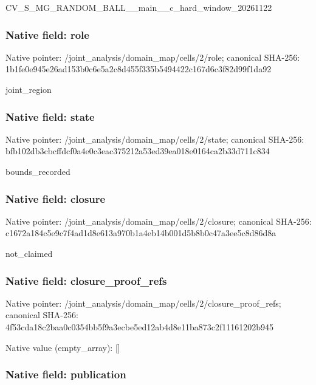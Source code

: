 \documentclass[10pt,a4paper]{article}
\begin{document}
CV\_S\_MG\_RANDOM\_BALL\_\_mai\allowbreak{}n\_\_c\_hard\_window\_2026112\allowbreak{}2


\subsubsection{Native field: role}


Native pointer: /joint\_analysis/domain\_map/cells/2/role; canonical SHA-256: 1b1fe0e945e26ad153b0c6e5\allowbreak{}a2c8d455f335b5494422c167\allowbreak{}d6c3f82d99f1da92


joint\_region


\subsubsection{Native field: state}


Native pointer: /joint\_analysis/domain\_m\allowbreak{}ap/cells/2/state; canonical SHA-256: bfb102db3cbcffdcf0a4e0c3\allowbreak{}eac375212a53ed39ea018e01\allowbreak{}64ca2b33d711c834


bounds\_recorded


\subsubsection{Native field: closure}


Native pointer: /joint\_analysis/domain\_m\allowbreak{}ap/cells/2/closure; canonical SHA-256: c1672a184c5e9c7f4ad1d8e6\allowbreak{}13a970b1a4eb14b001d5b8b0\allowbreak{}c47a3ee5c8d86d8a


not\_claimed


\subsubsection{Native field: closure\_proof\_refs}


Native pointer: /joint\_analysis/domain\_m\allowbreak{}ap/cells/2/closure\_proof\allowbreak{}\_refs; canonical SHA-256: 4f53cda18c2baa0c0354bb5f\allowbreak{}9a3ecbe5ed12ab4d8e11ba87\allowbreak{}3c2f11161202b945



Native value (empty\_array): []



\subsubsection{Native field: publication}
\end{document}
